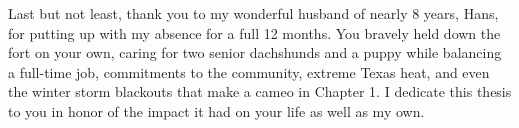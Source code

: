 Last but not least, thank you to my wonderful husband of nearly 8 years, Hans, for putting up with my absence for a full 12 months. You bravely held down the fort on your own, caring for two senior dachshunds and a puppy while balancing a full-time job, commitments to the community, extreme Texas heat, and even the winter storm blackouts that make a cameo in Chapter 1. I dedicate this thesis to you in honor of the impact it had on your life as well as my own.

